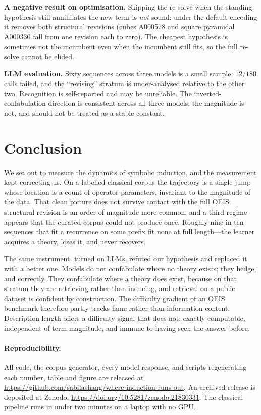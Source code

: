 \documentclass[10pt]{article}
\newif\ifanon
\theoremstyle{definition}
\theoremstyle{plain}
\begin{document}
\textbf{A negative result on optimisation.} Skipping the re-solve when the
standing hypothesis still annihilates the new term is \emph{not} sound: under
the default encoding it removes both structural revisions (cubes A000578 and
square pyramidal A000330 fall from one revision each to zero). The cheapest
hypothesis is sometimes not the incumbent even when the incumbent still fits,
so the full re-solve cannot be elided.

\textbf{LLM evaluation.} Sixty sequences across three models is a small sample,
$12/180$ calls failed, and the ``revising'' stratum is under-analysed relative
to the other two. Recognition is self-reported and may be unreliable. The
inverted-confabulation direction is consistent across all three models; the
magnitude is not, and should not be treated as a stable constant.

\section{Conclusion}

We set out to measure the dynamics of symbolic induction, and the measurement
kept correcting us. On a labelled classical corpus the trajectory is a single
jump whose location is a count of operator parameters, invariant to the
magnitude of the data. That clean picture does not survive contact with the
full OEIS: structural revision is an order of magnitude more common, and a
third regime appears that the curated corpus could not produce once. Roughly
nine in ten sequences that fit a recurrence on some prefix fit none at full
length---the learner acquires a theory, loses it, and never recovers.

The same instrument, turned on LLMs, refuted our hypothesis and
replaced it with a better one. Models do not confabulate where no theory
exists; they hedge, and correctly. They confabulate where a theory does exist,
because on that stratum they are retrieving rather than inducing, and retrieval
on a public dataset is confident by construction. The difficulty gradient of an
OEIS benchmark therefore partly tracks fame rather than information content.
Description length offers a difficulty signal that does not: exactly
computable, independent of term magnitude, and immune to having seen the answer
before.

\paragraph{Reproducibility.}
\ifanon
Code and data will be released upon acceptance.
The classical pipeline runs in under two minutes on a laptop with no GPU.
\else
All code, the corpus generator, every model
response, and scripts regenerating each number, table and figure are released at
\url{https://github.com/sabilashang/where-induction-runs-out}.
An archived release is deposited at Zenodo,
\url{https://doi.org/10.5281/zenodo.21830331}.
The classical pipeline runs in under two minutes on a laptop with no GPU.
\fi
\end{document}

